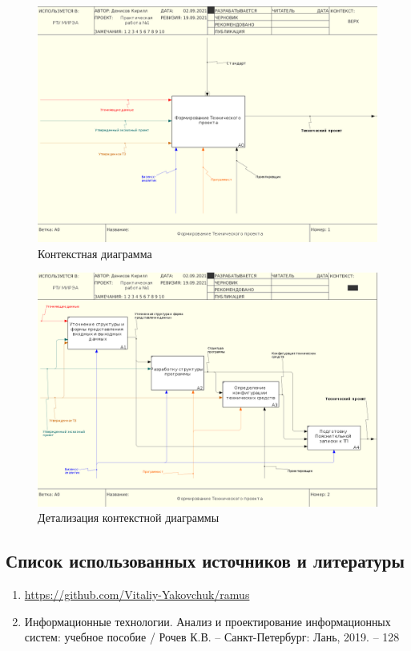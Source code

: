 \documentclass[a4paper,14pt]{extarticle}
\begin{document}
\begin{figure}[htpb]
	\centering
	\includegraphics[width=0.7\linewidth]{images/ramusPr1.1}
	\caption{Контекстная диаграмма}
	\label{fig:ramusPr1.1}
\end{figure}
\begin{figure}[htpb]
	\centering
	\includegraphics[width=0.7\linewidth]{images/ramusPr1.2}
	\caption{Детализация контекстной диаграммы}
	\label{fig:ramusPr1.2}
\end{figure}

	\newpage
	\subsection*{Список использованных источников и литературы}
	\begin{enumerate}
		\item \url{https://github.com/Vitaliy-Yakovchuk/ramus}
		\item Информационные технологии. Анализ и проектирование информационных систем: учебное пособие / Рочев К.В. – Санкт-Петербург: Лань, 2019. – 128
	\end{enumerate}
\end{document}
